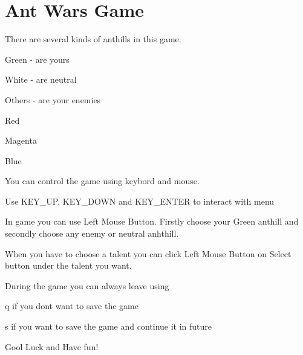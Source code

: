\chapter{Ant Wars Game}
\hypertarget{index}{}\label{index}
\label{index_md_examples_2DOCUMENTATION}%
%
 There are several kinds of anthills in this game.
\begin{DoxyItemize}
\item {\ttfamily Green} -\/ are yours
\item {\ttfamily White} -\/ are neutral
\item {\ttfamily Others} -\/ are your enemies
\begin{DoxyItemize}
\item {\ttfamily Red} ~\newline

\item {\ttfamily Magenta}
\item {\ttfamily Blue}
\end{DoxyItemize}
\end{DoxyItemize}

You can control the game using keybord and mouse.


\begin{DoxyItemize}
\item Use {\ttfamily KEY\+\_\+\+UP, KEY\+\_\+\+DOWN and KEY\+\_\+\+ENTER} to interact with menu
\item In game you can use {\ttfamily Left Mouse Button}. Firstly choose your {\ttfamily Green} anthill and secondly choose any enemy or neutral anhthill.
\item When you have to choose a talent you can click {\ttfamily Left Mouse Button} on {\ttfamily Select} button under the talent you want.
\end{DoxyItemize}

During the game you can always leave using
\begin{DoxyItemize}
\item {\ttfamily q} if you dont want to save the game
\item {\ttfamily s} if you want to save the game and continue it in future
\end{DoxyItemize}

Gool Luck and Have fun! 